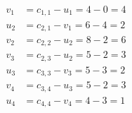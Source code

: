 \[
\begin{aligned}
v_{1} &= c_{1,1} - u_{1} = 4 - 0 = 4 \\
u_{2} &= c_{2,1} - v_{1} = 6 - 4 = 2 \\
v_{2} &= c_{2,2} - u_{2} = 8 - 2 = 6 \\
v_{3} &= c_{2,3} - u_{2} = 5 - 2 = 3 \\
u_{3} &= c_{3,3} - v_{3} = 5 - 3 = 2 \\
v_{4} &= c_{3,4} - u_{3} = 5 - 2 = 3 \\
u_{4} &= c_{4,4} - v_{4} = 4 - 3 = 1 \\
\end{aligned}
\]

